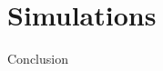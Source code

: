 \documentclass{beamer}
\begin{document}
\section{Simulations}

\begin{frame}
\end{frame}

\begin{frame}
\end{frame}

\begin{frame}
\end{frame}

\begin{frame}{Conclusion}
\end{frame}
\end{document}

